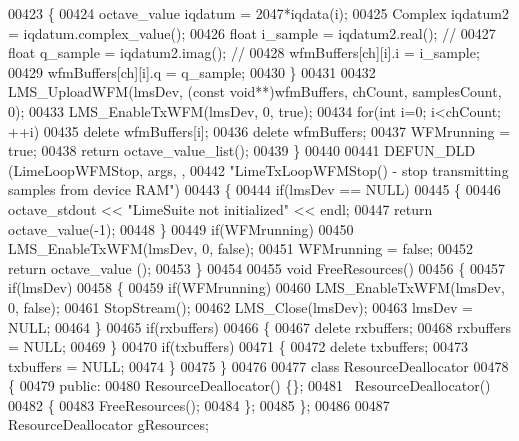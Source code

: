 \begin{DoxyCode}
00423         \{
00424             octave\_value    iqdatum = 2047*iqdata(i);
00425             Complex iqdatum2 = iqdatum.complex\_value();
00426             \textcolor{keywordtype}{float} i\_sample = iqdatum2.real(); \textcolor{comment}{//}
00427             \textcolor{keywordtype}{float} q\_sample = iqdatum2.imag(); \textcolor{comment}{//}
00428             wfmBuffers[ch][i].i = i\_sample;
00429             wfmBuffers[ch][i].q = q\_sample;
00430         \}
00431 
00432     LMS_UploadWFM(lmsDev, (\textcolor{keyword}{const} \textcolor{keywordtype}{void}**)wfmBuffers, chCount, samplesCount, 0);
00433     LMS_EnableTxWFM(lmsDev, 0, \textcolor{keyword}{true});
00434     \textcolor{keywordflow}{for}(\textcolor{keywordtype}{int} i=0; i<chCount; ++i)
00435         \textcolor{keyword}{delete} wfmBuffers[i];
00436     \textcolor{keyword}{delete} wfmBuffers;
00437     WFMrunning = \textcolor{keyword}{true};
00438     \textcolor{keywordflow}{return} octave\_value\_list();
00439 \}
00440 
00441 DEFUN_DLD (LimeLoopWFMStop, args, ,
00442 \textcolor{stringliteral}{"LimeTxLoopWFMStop() - stop transmitting samples from device RAM"})
00443 \{
00444     \textcolor{keywordflow}{if}(lmsDev == NULL)
00445     \{
00446         octave\_stdout << \textcolor{stringliteral}{"LimeSuite not initialized"} << endl;
00447         \textcolor{keywordflow}{return} octave\_value(-1);
00448     \}
00449     \textcolor{keywordflow}{if}(WFMrunning)
00450         LMS_EnableTxWFM(lmsDev, 0, \textcolor{keyword}{false});
00451     WFMrunning = \textcolor{keyword}{false};
00452     \textcolor{keywordflow}{return} octave\_value ();
00453 \}
00454 
00455 \textcolor{keywordtype}{void} FreeResources()
00456 \{
00457     \textcolor{keywordflow}{if}(lmsDev)
00458     \{
00459         \textcolor{keywordflow}{if}(WFMrunning)
00460             LMS_EnableTxWFM(lmsDev, 0, \textcolor{keyword}{false});
00461         StopStream();
00462         LMS_Close(lmsDev);
00463         lmsDev = NULL;
00464     \}
00465     \textcolor{keywordflow}{if}(rxbuffers)
00466     \{
00467         \textcolor{keyword}{delete} rxbuffers;
00468         rxbuffers = NULL;
00469     \}
00470     \textcolor{keywordflow}{if}(txbuffers)
00471     \{
00472         \textcolor{keyword}{delete} txbuffers;
00473         txbuffers = NULL;
00474     \}
00475 \}
00476 
00477 \textcolor{keyword}{class }ResourceDeallocator
00478 \{
00479 \textcolor{keyword}{public}:
00480     ResourceDeallocator() \{\};
00481     ~ResourceDeallocator()
00482     \{
00483         FreeResources();
00484     \};
00485 \};
00486 
00487 ResourceDeallocator gResources;
\end{DoxyCode}
